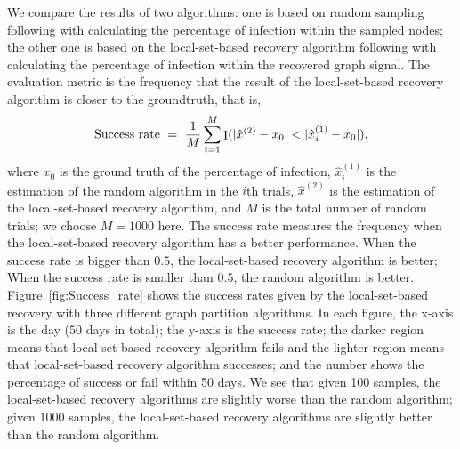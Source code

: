 \documentclass[journal,twocolumn,10pt]{IEEEtran}
\theoremstyle{definition}
\DeclareMathOperator{\Id}{I}
\begin{document}
We compare the results of two algorithms: one is based on random sampling following with calculating the percentage of infection within the sampled nodes; the other one is based on the local-set-based recovery algorithm following with calculating the percentage of infection within the recovered graph signal. The evaluation metric is the frequency that the result of the local-set-based recovery algorithm is closer to the groundtruth, that is,
\begin{equation*}
{\rm Success~rate}  \ = \ \frac{1}{M}  \sum_{i=1}^M  \Id ( | \hat{x}^{(2)} - x_0 | <  | \hat{x}^{(1)}_{i} - x_0 | ),
\end{equation*} 
where $ x_0$ is the ground truth of the percentage of infection,
$ \hat{x}^{(1)}_{i}$ is the estimation of the random algorithm in the $i$th trials, $\hat{x}^{(2)}$ is the estimation of the local-set-based recovery algorithm, and $M$ is the total number of random trials; we choose $M= 1000$ here.  The success rate measures the frequency when the local-set-based recovery algorithm has a better performance. When the success rate is bigger than $0.5$, the local-set-based recovery algorithm is better;  When the success rate is smaller than $0.5$, the random algorithm is better. Figure~\ref{fig:Success_rate} shows the success rates given by the local-set-based recovery with three different graph partition algorithms. In each figure, the x-axis is the day ($50$ days in total); the y-axis is the success rate; the darker region means that local-set-based recovery algorithm fails and the lighter  region means that local-set-based recovery algorithm successes; and the number shows the percentage of success or fail within 50 days. We see that given 100 samples, the local-set-based recovery algorithms are slightly worse than the random algorithm; given 1000 samples, the local-set-based recovery algorithms are slightly better than the random algorithm.
\end{document}
